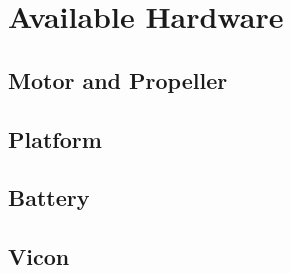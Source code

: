 \section{Available Hardware}

\subsection{Motor and Propeller}

\subsection{Platform}

\subsection{Battery}

\subsection{Vicon}
